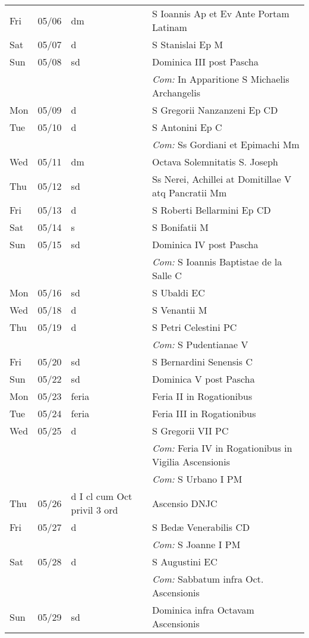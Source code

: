 \documentclass[10pt]{article}
\begin{document}
\begin{longtable}{ l l l l }
Fri & 05/06 & dm & S Ioannis Ap et Ev Ante Portam Latinam\\
Sat & 05/07 & d & S Stanislai Ep M\\
Sun & 05/08 & sd & Dominica III post Pascha\\
 & & & \textit{Com:} In Apparitione S Michaelis Archangelis\\
Mon & 05/09 & d & S Gregorii Nanzanzeni Ep CD\\
Tue & 05/10 & d & S Antonini Ep C\\
 & & & \textit{Com:} Ss Gordiani et Epimachi Mm\\
Wed & 05/11 & dm & Octava Solemnitatis S. Joseph\\
Thu & 05/12 & sd & Ss Nerei, Achillei at Domitillae V atq Pancratii Mm\\
Fri & 05/13 & d & S Roberti Bellarmini Ep CD\\
Sat & 05/14 & s & S Bonifatii M\\
Sun & 05/15 & sd & Dominica IV post Pascha\\
 & & & \textit{Com:} S Ioannis Baptistae de la Salle C\\
Mon & 05/16 & sd & S Ubaldi EC\\
Wed & 05/18 & d & S Venantii M\\
Thu & 05/19 & d & S Petri Celestini PC\\
 & & & \textit{Com:} S Pudentianae V\\
Fri & 05/20 & sd & S Bernardini Senensis C\\
Sun & 05/22 & sd & Dominica V post Pascha\\
Mon & 05/23 & feria & Feria II in Rogationibus\\
Tue & 05/24 & feria & Feria III in Rogationibus\\
Wed & 05/25 & d & S Gregorii VII PC\\
 & & & \textit{Com:} Feria IV in Rogationibus in Vigilia Ascensionis \\
 & & & \textit{Com:} S Urbano I PM\\
Thu & 05/26 & d I cl cum Oct privil 3 ord & Ascensio DNJC\\
Fri & 05/27 & d & S Bedæ Venerabilis CD\\
 & & & \textit{Com:} S Joanne I PM\\
Sat & 05/28 & d & S Augustini EC\\
 & & & \textit{Com:} Sabbatum infra Oct. Ascensionis\\
Sun & 05/29 & sd & Dominica infra Octavam Ascensionis\\

\end{longtable}
\end{document}
